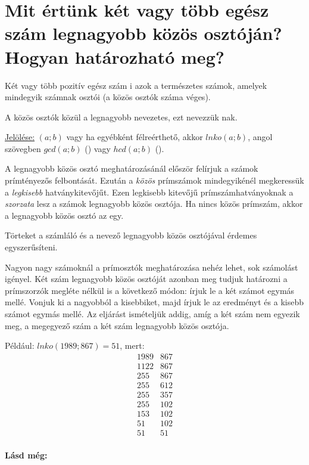 
\section{Mit értünk két vagy több egész szám legnagyobb közös osztóján?
  Hogyan határozható meg?}
\label{001}

\begin{defin}
Két vagy több pozitív egész szám i azok a természetes
számok, amelyek mindegyik számnak osztói (a közös osztók száma véges).
\end{defin}

\begin{defin}
A közös osztók közül a legnagyobb nevezetes, ezt nevezzük nak.

\uline{Jelölése:} $(a; b)$ vagy ha egyébként félreérthető, akkor $lnko(a; b)$,
angol szövegben $gcd(a; b)$ () vagy $hcd(a;
b)$ ().
\end{defin}

\begin{method}
A legnagyobb közös osztó meghatározásánál először felírjuk a számok
prímtényezős felbontását. Ezután a \emph{közös} prímszámok mindegyikénél
megkeressük a \emph{legkisebb} hatványkitevőjűt. Ezen legkisebb kitevőjű
prímszámhatványoknak a \emph{szorzata} lesz a számok legnagyobb közös osztója.
Ha nincs közös prímszám, akkor a legnagyobb közös osztó az egy.
\end{method}

\begin{note2}
Törteket a számláló és a nevező legnagyobb közös osztójával érdemes
egyszerűsíteni.
\end{note2}

\begin{method4}
Nagyon nagy számoknál a prímosztók meghatározása nehéz lehet, sok számolást
igényel. Két szám legnagyobb közös osztóját azonban meg tudjuk határozni a
prímszorzók megléte nélkül is a következő módon: írjuk le a két számot egymás
mellé. Vonjuk ki a nagyobból a kisebbiket, majd írjuk le az eredményt és a
kisebb számot egymás mellé. Az eljárást ismételjük addig, amíg a két szám nem
egyezik meg, a megegyező szám a két szám legnagyobb közös osztója.

Például: $lnko(1989; 867) = 51$, mert:
\[
\begin{array}{r|l}
  1989 & 867 \\
  1122 & 867 \\
  255 & 867 \\
  255 & 612 \\
  255 & 357 \\
  255 & 102 \\
  153 & 102 \\
  51 & 102 \\
  51 & 51 \\
\end{array}
\]
\end{method4}

\textbf{Lásd még:}
